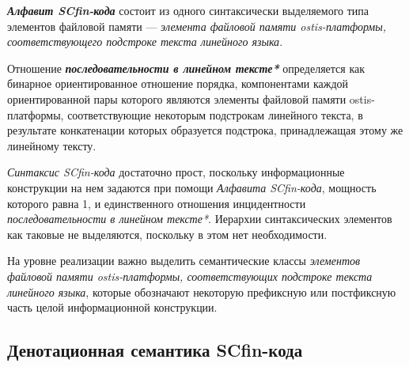 \textbf{\textit{Алфавит SCfin-кода\scnsupergroupsign}} состоит из одного синтаксически выделяемого типа элементов файловой памяти --- \textit{элемента файловой памяти ostis-платформы, соответствующего подстроке текста линейного языка}.

\begin{SCn}
\end{SCn}

Отношение \textbf{\textit{последовательности в линейном тексте*}} определяется как бинарное ориентированное отношение порядка, компонентами каждой ориентированной пары которого являются элементы файловой памяти ostis-платформы, соответствующие некоторым подстрокам линейного текста, в результате конкатенации которых образуется подстрока, принадлежащая этому же линейному тексту.

\textit{Синтаксис SCfin-кода} достаточно прост, поскольку информационные конструкции на нем задаются при помощи \textit{Алфавита SCfin-кода\scnsupergroupsign}, мощность которого равна 1, и единственного отношения инцидентности \textit{последовательности в линейном тексте*}. Иерархии синтаксических элементов как таковые не выделяются, поскольку в этом нет необходимости.

На уровне реализации важно выделить семантические классы \textit{элементов файловой памяти ostis-платформы, соответствующих подстроке текста линейного языка}, которые обозначают некоторую префиксную или постфиксную часть целой информационной конструкции.

\subsection{Денотационная семантика SCfin-кода}
\label{sec_soft_platform_scfin_code_semantic}

\begin{SCn}
\begin{scnsubstruct}

\begin{scnindent}
    \begin{scneqtoset}
    \end{scneqtoset}
\end{scnindent}

\end{scnsubstruct}
\end{SCn}

